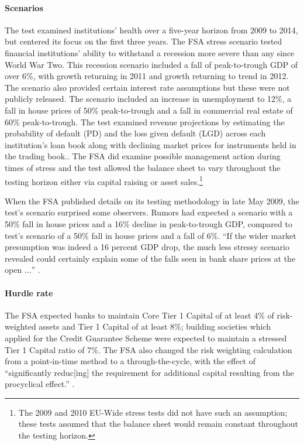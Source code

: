 \documentclass[12pt]{article}
\begin{document}
\paragraph{Scenarios} The test examined institutions' health over a five-year horizon from 2009 to 2014, but centered its focus on the first three years. The FSA stress scenario tested financial institutions' ability to withstand a recession more severe than any since World War Two. This recession scenario included a fall of peak-to-trough GDP of over 6\%, with growth returning in 2011 and growth returning to trend in 2012. The scenario also provided certain interest rate assumptions but these were not publicly released. The scenario included an increase in unemployment to 12\%, a fall in house prices of 50\% peak-to-trough and a fall in commercial real estate of 60\% peak-to-trough. The test examined revenue projections by estimating the probability of default (PD) and the loss given default (LGD) across each institution's loan book along with declining market prices for instruments held in the trading book.\citep{Results}. The FSA did examine possible management action during times of stress and the test allowed the balance sheet to vary throughout the testing horizon either via capital raising or asset sales.\footnote{The 2009 and 2010 EU-Wide stress tests did not have such an assumption; these tests assumed that the balance sheet would remain constant throughout the testing horizon.}

When the FSA published details on its testing methodology in late May 2009, the test's scenario surprised some observers. Rumors had expected a scenario with a 50\% fall in house prices and a 16\% decline in peak-to-trough GDP, compared to test's scenario of a 50\% fall in house prices and a fall of 6\%. ``If the wider market presumption was indeed a 16 percent GDP drop, the much less stressy scenario revealed could certainly explain some of the falls seen in bank share prices at the open $\dots$'' \citep{Stressy}.

\paragraph{Hurdle rate}

The FSA expected banks to maintain Core Tier 1 Capital of at least 4\% of risk-weighted assets and Tier 1 Capital of at least 8\%; building societies which applied for the Credit Guarantee Scheme were expected to maintain a stressed Tier 1 Capital ratio of 7\%. \citep{Results} The FSA also changed the risk weighting calculation from a point-in-time method to a through-the-cycle, with the effect of ``significantly reduc[ing] the requirement for additional capital resulting from the procyclical effect.'' \citep{Jan2009}.
\end{document}

